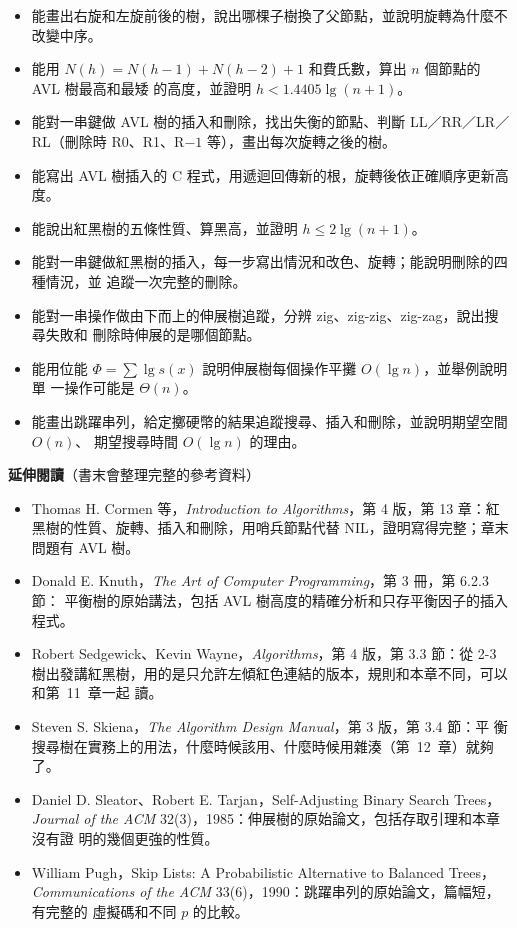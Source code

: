 \begin{itemize}
\item 能畫出右旋和左旋前後的樹，說出哪棵子樹換了父節點，並說明旋轉為什麼不改變中序。
\item 能用 $N(h) = N(h-1) + N(h-2) + 1$ 和費氏數，算出 $n$ 個節點的 AVL 樹最高和最矮
的高度，並證明 $h < 1.4405 \lg(n+1)$。
\item 能對一串鍵做 AVL 樹的插入和刪除，找出失衡的節點、判斷 LL／RR／LR／RL（刪除時
R0、R1、R$-1$ 等），畫出每次旋轉之後的樹。
\item 能寫出 AVL 樹插入的 C 程式，用遞迴回傳新的根，旋轉後依正確順序更新高度。
\item 能說出紅黑樹的五條性質、算黑高，並證明 $h \le 2\lg(n+1)$。
\item 能對一串鍵做紅黑樹的插入，每一步寫出情況和改色、旋轉；能說明刪除的四種情況，並
追蹤一次完整的刪除。
\item 能對一串操作做由下而上的伸展樹追蹤，分辨 zig、zig-zig、zig-zag，說出搜尋失敗和
刪除時伸展的是哪個節點。
\item 能用位能 $\Phi = \sum \lg s(x)$ 說明伸展樹每個操作平攤 $O(\lg n)$，並舉例說明單
一操作可能是 $\Theta(n)$。
\item 能畫出跳躍串列，給定擲硬幣的結果追蹤搜尋、插入和刪除，並說明期望空間 $O(n)$、
期望搜尋時間 $O(\lg n)$ 的理由。
\end{itemize}

\textbf{延伸閱讀}（書末會整理完整的參考資料）

\begin{itemize}
\item Thomas H. Cormen 等，\textit{Introduction to Algorithms}，第 4 版，第 13 章：紅
黑樹的性質、旋轉、插入和刪除，用哨兵節點代替 NIL，證明寫得完整；章末問題有 AVL 樹。
\item Donald E. Knuth，\textit{The Art of Computer Programming}，第 3 冊，第 6.2.3 節：
平衡樹的原始講法，包括 AVL 樹高度的精確分析和只存平衡因子的插入程式。
\item Robert Sedgewick、Kevin Wayne，\textit{Algorithms}，第 4 版，第 3.3 節：從 2-3
樹出發講紅黑樹，用的是只允許左傾紅色連結的版本，規則和本章不同，可以和第~11~章一起
讀。
\item Steven S. Skiena，\textit{The Algorithm Design Manual}，第 3 版，第 3.4 節：平
衡搜尋樹在實務上的用法，什麼時候該用、什麼時候用雜湊（第~12~章）就夠了。
\item Daniel D. Sleator、Robert E. Tarjan，Self-Adjusting Binary Search Trees，
\textit{Journal of the ACM} 32(3)，1985：伸展樹的原始論文，包括存取引理和本章沒有證
明的幾個更強的性質。
\item William Pugh，Skip Lists: A Probabilistic Alternative to Balanced Trees，
\textit{Communications of the ACM} 33(6)，1990：跳躍串列的原始論文，篇幅短，有完整的
虛擬碼和不同 $p$ 的比較。
\end{itemize}

